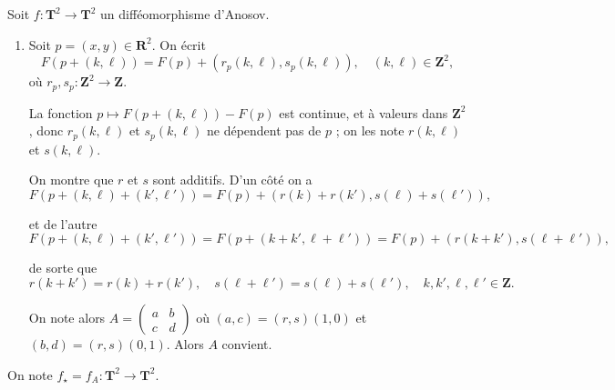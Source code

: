 \documentclass[a4paper,12pt,openany]{article}
\theoremstyle{plain}
\theoremstyle{definition}
\newcommand{\T}{\mathbf{T}}
\newcommand{\R}{\mathbf{R}}
\newcommand{\Z}{\mathbf{Z}}
\begin{document}
\vspace{0.6cm}

 \vspace{1.5mm} 

\noindent Soit $f : \T^2 \to \T^2$ un diff\'eomorphisme d'Anosov.

\begin{enumerate}
\item Soit $p = (x,y) \in \R^2.$ On \'ecrit 
$$
F(p + (k,\ell)) = F(p) + (r_p(k,\ell), s_p(k,\ell)), \quad (k, \ell) \in \Z^2,
$$
o\`u $r_p, s_p : \Z^2 \to \Z$.




La fonction $p \mapsto F(p + (k, \ell)) - F(p)$ est continue, et \`a valeurs dans $\Z^2$, donc $r_p(k, \ell)$ et $s_p(k, \ell)$ ne d\'ependent pas de $p$ ; on les note $r(k, \ell)$ et $s(k,\ell)$.




On montre que $r$ et $s$ sont additifs. D'un c\^ot\'e on a
$$
F(p + (k, \ell) + (k',\ell')) = F(p) + (r(k) + r(k'), s(\ell) + s(\ell')),
$$

%
et de l'autre
$$
F(p + (k, \ell) + (k',\ell'))  = F(p + (k + k', \ell + \ell')) = F(p) + (r(k + k'), s(\ell + \ell')),
$$

%
de sorte que
$$
r(k + k') = r(k) + r(k'), \quad s(\ell + \ell') = s(\ell) + s(\ell'), \quad k,k',\ell,\ell' \in \Z.
$$




On note alors $A = \begin{pmatrix} a & b \\ c & d \end{pmatrix}$ o\`u
$
(a,c) = (r,s)(1,0)$ et $ (b,d) = (r,s)(0,1).
$
Alors $A$ convient.
\end{enumerate}
On note $f_\star = f_A : \T^2 \to \T^2$.
\end{document}
